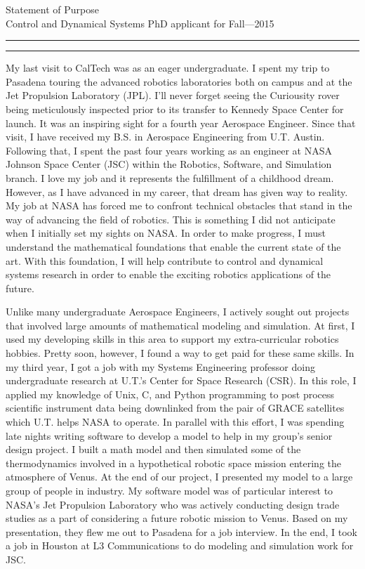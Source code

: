 \documentclass{article}
\newcommand{\soptitle}{Statement of Purpose}
\begin{document}
\begin{center}\LARGE\soptitle\\
\large Control and Dynamical Systems PhD applicant for Fall---2015
\end{center}

\hrule
\vspace{1pt}
\hrule height 1pt

\bigskip
My last visit to CalTech was as an eager undergraduate. I spent my trip to Pasadena touring the advanced robotics laboratories both on campus and at the Jet Propulsion Laboratory (JPL). I'll never forget seeing the Curiousity rover being meticulously inspected prior to its transfer to Kennedy Space Center for launch. It was an inspiring sight for a fourth year Aerospace Engineer. Since that visit, I have received my B.S. in Aerospace Engineering from U.T. Austin. Following that, I spent the past four years working as an engineer at NASA Johnson Space Center (JSC) within the Robotics, Software, and Simulation branch. I love my job and it represents the fulfillment of a childhood dream. However, as I have advanced in my career, that dream has given way to reality. My job at NASA has forced me to confront technical obstacles that stand in the way of advancing the field of robotics. This is something I did not anticipate when I initially set my sights on NASA. In order to make progress, I must understand the mathematical foundations that enable the current state of the art. With this foundation, I will help contribute to control and dynamical systems research in order to enable the exciting robotics applications of the future. 


Unlike many undergraduate Aerospace Engineers, I actively sought out projects that involved
large amounts of mathematical modeling and simulation. At first, I used my developing skills in this area to support my extra-curricular robotics hobbies. Pretty soon, however, I found a way to get paid for these same skills. In my third year, I got a job with my Systems Engineering professor doing undergraduate research at U.T.'s Center for Space Research (CSR). In this role, I applied my knowledge of Unix, C, and Python programming to post process scientific instrument data being downlinked
from the pair of GRACE satellites which U.T. helps NASA to operate. In parallel with this effort,
I was spending late nights writing software to develop a model to help in my group's senior design project.
I built a math model and then simulated some of the thermodynamics involved in a hypothetical
robotic space mission entering the atmosphere of Venus. At the end of our project, I presented my model to a
large group of people in industry. My software model was of particular interest to NASA's Jet Propulsion
Laboratory who was actively conducting design trade studies as a part of considering a future robotic 
mission to Venus. Based on my presentation, they flew me out to Pasadena for a job interview. In the end,
I took a job in Houston at L3 Communications to do modeling and simulation work for JSC. 
\end{document}
